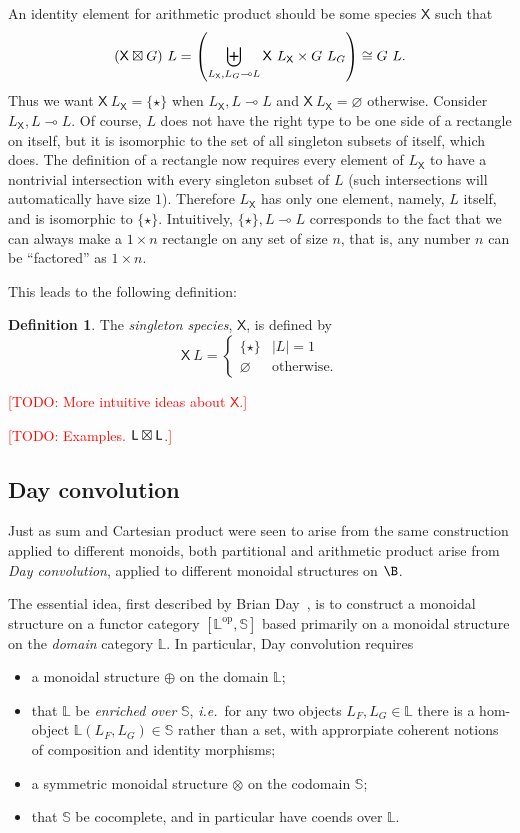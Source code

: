 \documentclass[preprint,authoryear]{sigplanconf}
\newcommand{\todo}[1]{\textcolor{red}{[TODO: #1]}}
\newcommand{\todo}[1]{}
\newcommand{\ie}{\latin{i.e.}\xspace}
\newcommand{\term}[1]{\emph{#1}}
\newcommand{\latin}[1]{\textit{#1}}
\newcommand{\bbb}[1]{\ensuremath{\mathbb{#1}}\xspace}
\newcommand{\msf}[1]{\ensuremath{\mathsf{#1}}\xspace}
\newcommand{\singleton}{\{\star\}}
\newcommand{\rectangle}{\multimap}
\newcommand{\iso}{\cong}              %
\theoremstyle{definition}
\newtheorem{defn}[thm]{Definition}
\theoremstyle{remark}
\newcommand{\op}{\ensuremath{\mathrm{op}}}            %
\providecommand{\Sp}{}
\renewcommand{\Sp}{\msf}
\newcommand{\X}{\Sp{X}}
\newcommand{\List}{\Sp{L}}
\newcommand{\Lab}{\bbb{L}}
\newcommand{\Str}{\bbb{S}}
\begin{document}
An identity element for arithmetic product should be some species $\X$
such that \[ (\X \aprod G)\ L = \left(\biguplus_{L_\X, L_G \rectangle L} \X\
L_\X \times G\ L_G\right) \iso G\ L. \] Thus we want $\X\ L_\X = \singleton$
when $L_\X, L \rectangle L$ and $\X\ L_\X = \varnothing$ otherwise.
Consider $L_\X, L \rectangle L$.  Of course, $L$ does not have the
right type to be one side of a rectangle on itself, but it is
isomorphic to the set of all singleton subsets of itself, which does.
The definition of a rectangle now requires every element of $L_\X$ to
have a nontrivial intersection with every singleton subset of $L$
(such intersections will automatically have size $1$).  Therefore
$L_\X$ has only one element, namely, $L$ itself, and is isomorphic to
$\singleton$.  Intuitively, $\singleton, L \rectangle L$ corresponds
to the fact that we can always make a $1 \times n$ rectangle on any
set of size $n$, that is, any number $n$ can be ``factored'' as $1
\times n$.

This leads to the following definition:
\begin{defn}
  The \term{singleton species}, $\X$, is defined by \[ \X\ L =
  \begin{cases}
    \singleton & |L| = 1 \\
    \varnothing & \text{otherwise}.
  \end{cases}
  \]
\end{defn}

\todo{More intuitive ideas about $\X$.}

\todo{Examples. $\List \aprod \List$.}

\subsection{Day convolution}
\label{sec:day-convolution}

Just as sum and Cartesian product were seen to arise from the same
construction applied to different monoids, both partitional and
arithmetic product arise from \emph{Day convolution}, applied to
different monoidal structures on $\B$.

The essential idea, first described by Brian
Day~\cite{day1970closed}, is to construct a monoidal structure on a
functor category $[\Lab^\op, \Str]$ based primarily on a monoidal
structure on the \emph{domain} category $\Lab$.  In particular, Day
convolution requires
\begin{itemize}
\item a monoidal structure $\oplus$ on the domain $\Lab$;
\item that $\Lab$ be \emph{enriched over} $\Str$, \ie\ for any two
  objects $L_F,L_G \in \Lab$ there is a hom-object $\Lab(L_F,L_G) \in
  \Str$ rather than a set, with approrpiate coherent notions of
  composition and identity morphisms;
\item a symmetric monoidal structure $\otimes$ on the codomain $\Str$;
\item that $\Str$ be cocomplete, and in particular
  have coends over $\Lab$.
\end{itemize}
\end{document}
